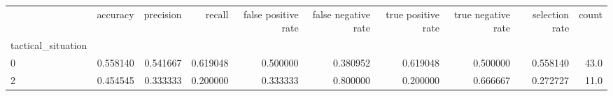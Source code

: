 \begin{tabular}{lrrrrrrrrr}
\toprule
{} &  accuracy &  precision &    recall &  false positive rate &  false negative rate &  true positive rate &  true negative rate &  selection rate &  count \\
tactical\_situation &           &            &           &                      &                      &                     &                     &                 &        \\
\midrule
0                  &  0.558140 &   0.541667 &  0.619048 &             0.500000 &             0.380952 &            0.619048 &            0.500000 &        0.558140 &   43.0 \\
2                  &  0.454545 &   0.333333 &  0.200000 &             0.333333 &             0.800000 &            0.200000 &            0.666667 &        0.272727 &   11.0 \\
\bottomrule
\end{tabular}
